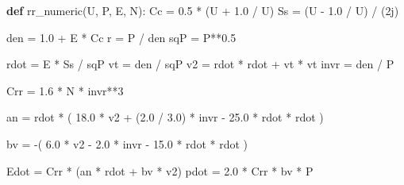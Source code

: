\documentclass[
  a4paper,
]{ltjsarticle}
\newenvironment{Shaded}{}{}
\newcommand{\DecValTok}[1]{\textcolor[rgb]{0.25,0.63,0.44}{#1}}
\newcommand{\FloatTok}[1]{\textcolor[rgb]{0.25,0.63,0.44}{#1}}
\newcommand{\KeywordTok}[1]{\textcolor[rgb]{0.00,0.44,0.13}{\textbf{#1}}}
\newcommand{\NormalTok}[1]{#1}
\newcommand{\OperatorTok}[1]{\textcolor[rgb]{0.40,0.40,0.40}{#1}}
\newcommand{\OtherTok}[1]{\textcolor[rgb]{0.00,0.44,0.13}{#1}}
\begin{document}
\begin{Shaded}
\begin{Highlighting}[]
\KeywordTok{def}\NormalTok{ rr\_numeric(U, P, E, N):}
\NormalTok{    Cc }\OperatorTok{=} \FloatTok{0.5} \OperatorTok{*}\NormalTok{ (U }\OperatorTok{+} \FloatTok{1.0} \OperatorTok{/}\NormalTok{ U)}
\NormalTok{    Ss }\OperatorTok{=}\NormalTok{ (U }\OperatorTok{{-}} \FloatTok{1.0} \OperatorTok{/}\NormalTok{ U) }\OperatorTok{/}\NormalTok{ (}\OtherTok{2j}\NormalTok{)}

\NormalTok{    den }\OperatorTok{=} \FloatTok{1.0} \OperatorTok{+}\NormalTok{ E }\OperatorTok{*}\NormalTok{ Cc}
\NormalTok{    r }\OperatorTok{=}\NormalTok{ P }\OperatorTok{/}\NormalTok{ den}
\NormalTok{    sqP }\OperatorTok{=}\NormalTok{ P}\OperatorTok{**}\FloatTok{0.5}

\NormalTok{    rdot }\OperatorTok{=}\NormalTok{ E }\OperatorTok{*}\NormalTok{ Ss }\OperatorTok{/}\NormalTok{ sqP}
\NormalTok{    vt }\OperatorTok{=}\NormalTok{ den }\OperatorTok{/}\NormalTok{ sqP}
\NormalTok{    v2 }\OperatorTok{=}\NormalTok{ rdot }\OperatorTok{*}\NormalTok{ rdot }\OperatorTok{+}\NormalTok{ vt }\OperatorTok{*}\NormalTok{ vt}
\NormalTok{    invr }\OperatorTok{=}\NormalTok{ den }\OperatorTok{/}\NormalTok{ P}

\NormalTok{    Crr }\OperatorTok{=} \FloatTok{1.6} \OperatorTok{*}\NormalTok{ N }\OperatorTok{*}\NormalTok{ invr}\OperatorTok{**}\DecValTok{3}

\NormalTok{    an }\OperatorTok{=}\NormalTok{ rdot }\OperatorTok{*}\NormalTok{ (}
        \FloatTok{18.0} \OperatorTok{*}\NormalTok{ v2}
        \OperatorTok{+}\NormalTok{ (}\FloatTok{2.0} \OperatorTok{/} \FloatTok{3.0}\NormalTok{) }\OperatorTok{*}\NormalTok{ invr}
        \OperatorTok{{-}} \FloatTok{25.0} \OperatorTok{*}\NormalTok{ rdot }\OperatorTok{*}\NormalTok{ rdot}
\NormalTok{    )}

\NormalTok{    bv }\OperatorTok{=} \OperatorTok{{-}}\NormalTok{(}
        \FloatTok{6.0} \OperatorTok{*}\NormalTok{ v2}
        \OperatorTok{{-}} \FloatTok{2.0} \OperatorTok{*}\NormalTok{ invr}
        \OperatorTok{{-}} \FloatTok{15.0} \OperatorTok{*}\NormalTok{ rdot }\OperatorTok{*}\NormalTok{ rdot}
\NormalTok{    )}

\NormalTok{    Edot }\OperatorTok{=}\NormalTok{ Crr }\OperatorTok{*}\NormalTok{ (an }\OperatorTok{*}\NormalTok{ rdot }\OperatorTok{+}\NormalTok{ bv }\OperatorTok{*}\NormalTok{ v2)}
\NormalTok{    pdot }\OperatorTok{=} \FloatTok{2.0} \OperatorTok{*}\NormalTok{ Crr }\OperatorTok{*}\NormalTok{ bv }\OperatorTok{*}\NormalTok{ P}


\end{Highlighting}
\end{Shaded}
\end{document}
